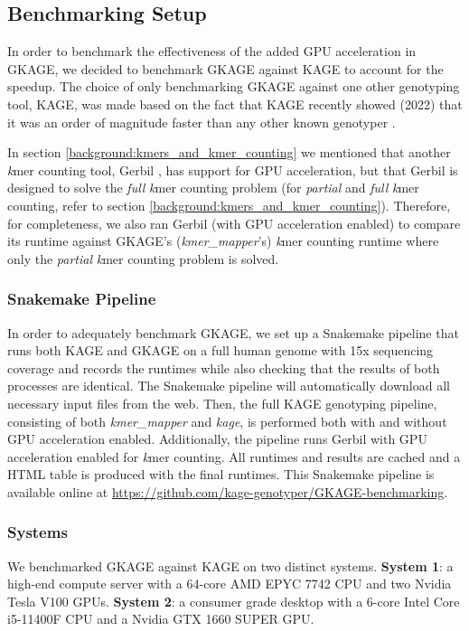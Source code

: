 \subsection{Benchmarking Setup} \label{methods:benchmarking_setup}
In order to benchmark the effectiveness of the added GPU acceleration in GKAGE, we decided to benchmark GKAGE against KAGE to account for the speedup.
The choice of only benchmarking GKAGE against one other genotyping tool, KAGE, was made based on the fact that KAGE recently showed (2022) that it was an order of magnitude faster than any other known genotyper \cite{kage}.

In section \ref{background:kmers_and_kmer_counting} we mentioned that another \textit{k}mer counting tool, Gerbil \cite{gerbil}, has support for GPU acceleration, but that Gerbil is designed to solve the \textit{full} \textit{k}mer counting problem (for \textit{partial} and \textit{full} \textit{k}mer counting, refer to section \ref{background:kmers_and_kmer_counting}).
Therefore, for completeness, we also ran Gerbil (with GPU acceleration enabled) to compare its runtime against GKAGE's (\textit{kmer\_mapper}'s) \textit{k}mer counting runtime where only the \textit{partial} \textit{k}mer counting problem is solved.

\subsubsection{Snakemake Pipeline} \label{methods:benchmarking_setup:snakemake_pipeline}
In order to adequately benchmark GKAGE, we set up a Snakemake pipeline that runs both KAGE and GKAGE on a full human genome with 15x sequencing coverage and records the runtimes while also checking that the results of both processes are identical.
The Snakemake pipeline will automatically download all necessary input files from the web. 
Then, the full KAGE genotyping pipeline, consisting of both \textit{kmer\_mapper} and \textit{kage}, is performed both with and without GPU acceleration enabled.
Additionally, the pipeline runs Gerbil with GPU acceleration enabled for \textit{k}mer counting.
All runtimes and results are cached and a HTML table is produced with the final runtimes.
This Snakemake pipeline is available online at \url{https://github.com/kage-genotyper/GKAGE-benchmarking}.

\subsubsection{Systems} \label{methods:benchmarking_setup:systems}
We benchmarked GKAGE against KAGE on two distinct systems.
\textbf{System 1}: a high-end compute server with a 64-core AMD EPYC 7742 CPU and two Nvidia Tesla V100 GPUs.
\textbf{System 2}: a consumer grade desktop with a 6-core Intel Core i5-11400F CPU and a Nvidia GTX 1660 SUPER GPU.

